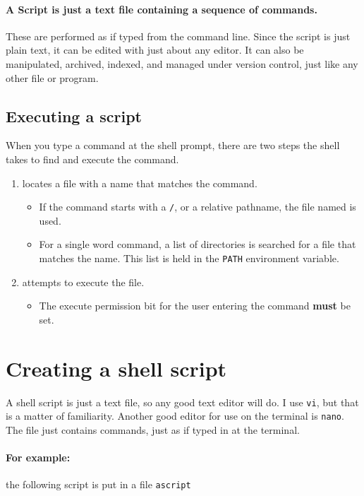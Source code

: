 \documentclass[12pt,a4paper]{article}
\begin{document}
\paragraph{A Script is just a text file containing a sequence of
  commands.}  These are performed as if typed from the command line.
Since the script is just plain text, it can be edited with just about any
editor.  It can also be manipulated, archived, indexed, and managed under
version control,  just like any other file or program.

\subsection{Executing a script}
When you type a command at the shell prompt, there are two steps the shell
takes to find and execute the command.
\begin{enumerate}
	\item locates a file with a name that matches the command.
		\begin{itemize}
			\item If the command starts with a \verb'/', or a relative
				pathname, the file named is used.
			\item For a single word command, a list of directories is searched
				for a file that matches the name.  This list is held in the
				\verb'PATH' environment variable.
		\end{itemize}
	\item attempts to execute the file.
		\begin{itemize}
			\item The execute permission bit for the user entering the command
				\textbf{must} be set.
		\end{itemize}
\end{enumerate}


\section{Creating a shell script}
A shell script is just a text file, so any good text editor will do.  I use
\verb'vi', but that is a matter of familiarity.  Another good editor for use
on the terminal is \verb'nano'.  The file just contains commands, just as if typed in at the terminal.


\paragraph{For example:} the following script is put in a file \texttt{ascript}
\begin{code}[title=ascript]
    
  \end{code}
\end{document}
